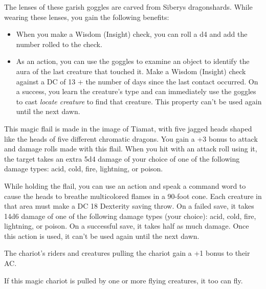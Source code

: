 \documentclass[10pt,a4paper,twoside,bg=print,twocolumn,openany,nodeprecatedcode]{dndbook}
\begin{document}
The lenses of these garish goggles are carved from Siberys dragonshards. While wearing these lenses, you gain the following benefits:


\begin{itemize}
\item When you make a Wisdom (Insight) check, you can roll a d4 and add the number rolled to the check.
\item As an action, you can use the goggles to examine an object to identify the aura of the last creature that touched it. Make a Wisdom (Insight) check against a DC of 13 + the number of days since the last contact occurred. On a success, you learn the creature's type and can immediately use the goggles to cast \textit{locate creature} to find that creature. This property can't be used again until the next dawn.
\end{itemize}

This magic flail is made in the image of Tiamat, with five jagged heads shaped like the heads of five different chromatic dragons. You gain a +3 bonus to attack and damage rolls made with this flail. When you hit with an attack roll using it, the target takes an extra 5d4 damage of your choice of one of the following damage types: acid, cold, fire, lightning, or poison.

While holding the flail, you can use an action and speak a command word to cause the heads to breathe multicolored flames in a 90-foot cone. Each creature in that area must make a DC 18 Dexterity saving throw. On a failed save, it takes 14d6 damage of one of the following damage types (your choice): acid, cold, fire, lightning, or poison. On a successful save, it takes half as much damage. Once this action is used, it can't be used again until the next dawn.

The chariot's riders and creatures pulling the chariot gain a +1 bonus to their AC.

If this magic chariot is pulled by one or more flying creatures, it too can fly.
\end{document}
